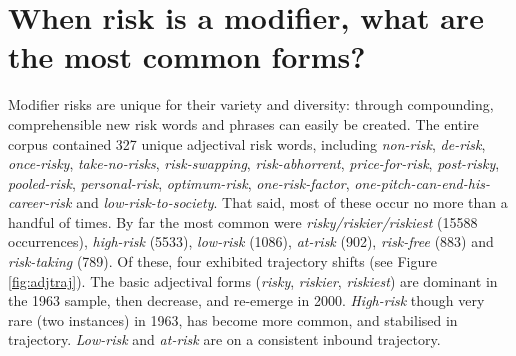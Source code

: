 



		\section{When risk is a modifier, what are the most common forms?}
		\FloatBarrier

			Modifier risks are unique for their variety and diversity: through compounding, comprehensible new risk words and phrases can easily be created. The entire corpus contained 327 unique adjectival risk words, including \emph{non-risk}, \emph{de-risk}, \emph{once-risky}, \emph{take-no-risks}, \emph{risk-swapping}, \emph{risk-abhorrent}, \emph{price-for-risk}, \emph{post-risky}, \emph{pooled-risk}, \emph{personal-risk}, \emph{optimum-risk}, \emph{one-risk-factor}, \emph{one-pitch-can-end-his-career-risk} and \emph{low-risk-to-society}. That said, most of these occur no more than a handful of times. By far the most common were \emph{risky\slash riskier\slash riskiest} (15588 occurrences), \emph{high-risk} (5533), \emph{low-risk} (1086), \emph{at-risk} (902), \emph{risk-free} (883) and \emph{risk-taking} (789). Of these, four exhibited trajectory shifts (see Figure \ref{fig:adjtraj}). The basic adjectival forms (\emph{risky}, \emph{riskier}, \emph{riskiest}) are dominant in the 1963 sample, then decrease, and re-emerge in 2000. \emph{High-risk} though very rare (two instances) in 1963, has become more common, and stabilised in trajectory. \emph{Low-risk} and \emph{at-risk} are on a consistent inbound trajectory.

